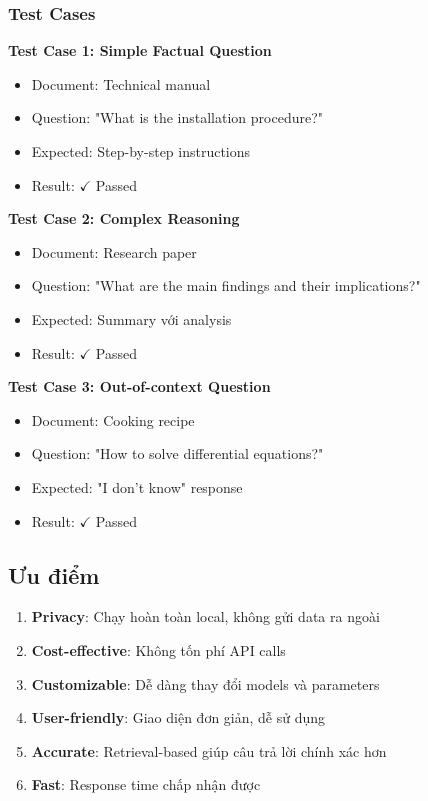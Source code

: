 \documentclass[a4paper]{article}
\begin{document}
\subsubsection{Test Cases}
\textbf{Test Case 1: Simple Factual Question}
\begin{itemize}
    \item Document: Technical manual
    \item Question: "What is the installation procedure?"
    \item Expected: Step-by-step instructions
    \item Result: $\checkmark$ Passed
\end{itemize}

\textbf{Test Case 2: Complex Reasoning}
\begin{itemize}
    \item Document: Research paper
    \item Question: "What are the main findings and their implications?"
    \item Expected: Summary với analysis
    \item Result: $\checkmark$ Passed
\end{itemize}

\textbf{Test Case 3: Out-of-context Question}
\begin{itemize}
    \item Document: Cooking recipe
    \item Question: "How to solve differential equations?"
    \item Expected: "I don't know" response
    \item Result: $\checkmark$ Passed
\end{itemize}
\subsection{Ưu điểm}
\begin{enumerate}
    \item \textbf{Privacy}: Chạy hoàn toàn local, không gửi data ra ngoài
    \item \textbf{Cost-effective}: Không tốn phí API calls
    \item \textbf{Customizable}: Dễ dàng thay đổi models và parameters
    \item \textbf{User-friendly}: Giao diện đơn giản, dễ sử dụng
    \item \textbf{Accurate}: Retrieval-based giúp câu trả lời chính xác hơn
    \item \textbf{Fast}: Response time chấp nhận được
\end{enumerate}
\end{document}
